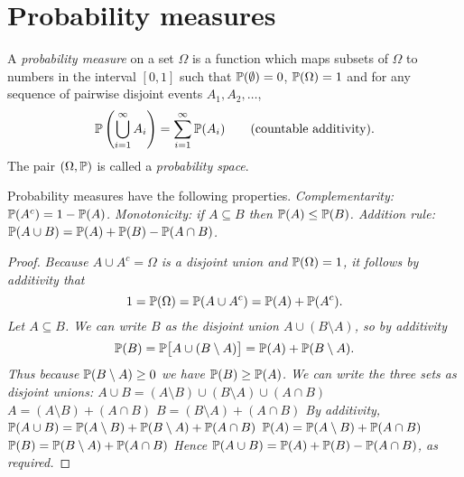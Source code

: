 
\section{Probability measures}\label{sec:}


\begin{definition}\label{def:prob_meas}
A \emph{probability measure} on a set $\Omega$ is a function which maps subsets of $\Omega$ to numbers in the interval $[0,1]$ such that $\mathbb{P}(\emptyset) = 0$, $\mathbb{P}(\Omega) = 1$ and for any sequence of pairwise disjoint events $A_1,A_2,\ldots$,
\[
\mathbb{P}\left(\bigcup_{i=1}^\infty A_i\right) = \sum_{i=1}^{\infty} \mathbb{P}(A_i)
\qquad\text{(countable additivity)}.
\]
The pair $(\Omega,\mathbb{P})$ is called a \emph{probability space}.
\end{definition}

\begin{theorem}\label{thm:props_pmeas}
Probability measures have the following properties.
\ben
\it Complementarity: $\mathbb{P}(A^c) = 1 - \mathbb{P}(A)$.
\it Monotonicity: if $A\subseteq B$ then $\mathbb{P}(A)\leq \mathbb{P}(B)$.
\it Addition rule: $\mathbb{P}(A\cup B) = \mathbb{P}(A) + \mathbb{P}(B) - \mathbb{P}(A\cap B)$.
\een
 \end{theorem}

\begin{proof}
\ben
\it Because $A\cup A^c=\Omega$ is a disjoint union and $\mathbb{P}(\Omega)=1$, it follows by additivity that 
\[
1 = \mathbb{P}(\Omega) = \mathbb{P}(A\cup A^c) = \mathbb{P}(A) + \mathbb{P}(A^c).
\]
\it Let $A\subseteq B$. We can write $B$ as the disjoint union $A\cup(B\setminus A)$, so by additivity
\[
\mathbb{P}(B) = \mathbb{P}\big[A\cup (B\setminus A)\big] = \mathbb{P}(A) + \mathbb{P}(B\setminus A).
\]
Thus because $\mathbb{P}(B\setminus A)\geq 0$ we have $\mathbb{P}(B) \geq \mathbb{P}(A)$.
\it We can write the three sets as disjoint unions:
\bit
\it $A\cup B = (A\setminus B) \cup (B\setminus A) \cup (A\cap B)$
\it $A 		 = (A\setminus B) + (A\cap B)$
\it $B 		 = (B\setminus A) + (A\cap B)$
\eit
By additivity, 
\bit
\it $\mathbb{P}(A\cup B) = \mathbb{P}(A\setminus B) + \mathbb{P}(B\setminus A) + \mathbb{P}(A\cap B)$
\it $\mathbb{P}(A) 		= \mathbb{P}(A\setminus B) + \mathbb{P}(A\cap B)$
\it $\mathbb{P}(B)		= \mathbb{P}(B\setminus A) + \mathbb{P}(A\cap B)$
\eit
Hence $\mathbb{P}(A\cup B) = \mathbb{P}(A) + \mathbb{P}(B) - \mathbb{P}(A\cap B)$, as required.
\een
\end{proof}

